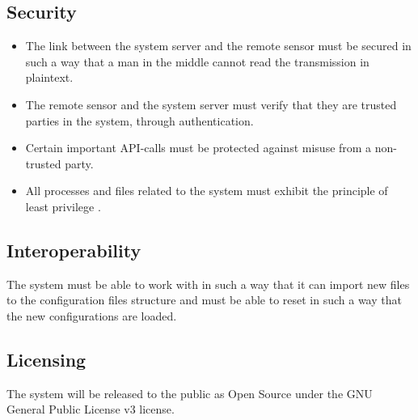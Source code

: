 \subsection{Security}
	\begin{itemize}
		\item The link between the system server and the remote sensor must be secured in such a way that a man in the middle cannot read the transmission in plaintext. 
		\item The remote sensor and the system server must verify that they are trusted
		parties in the system, through authentication.
		\item Certain important API-calls must be protected against misuse from a
		non-trusted party.
		\item All processes and files related to the system must exhibit the principle
		of least privilege \cite{saltzer}.
	\end{itemize}
\subsection{Interoperability}
The system must be able to work with \snort{} in such a way that it can
import new files to the \snort{} configuration files structure and must be able to
reset \snort{} in such a way that the new configurations are loaded.
\subsection{Licensing}
The system will be released to the public as Open Source under the GNU General
Public License v3 license\cite{GPL}.
